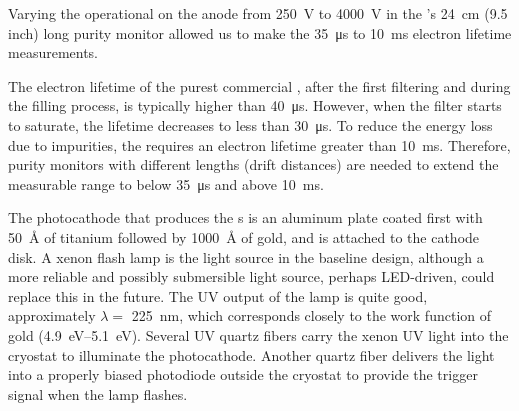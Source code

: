Varying the operational  on the anode from \SI{250}{V} to \SI{4000}{V} in the 's \SI{24}{cm} (9.5 inch) long purity monitor allowed us to make the \SI{35}{\micro\second} to \SI{10}{\milli\second} electron lifetime measurements. 


The electron lifetime of the purest commercial \lar, after the first filtering and during the filling process, is typically higher than \SI{40}{\micro\second}. However, when the filter starts to saturate, the lifetime decreases to less than \SI{30}{\micro\second}.  To %
reduce the energy loss due to impurities,  the  requires an electron lifetime greater than \SI{10}{\milli\second}. Therefore, purity monitors with different lengths (drift distances) are needed to extend the measurable range to below \SI{35}{\micro\second} and above  \SI{10}{\milli\second}.

The photocathode that produces the \phel{}s is an aluminum plate coated first with \SI{50}{\angstrom} of titanium followed by \SI{1000}{\angstrom} of gold, and is attached to the cathode disk.
A xenon flash lamp is the light source in the baseline design, although %
a more reliable and possibly submersible light source, perhaps LED-driven, could replace this in the future. The UV output of the lamp is quite good, approximately $\lambda=$ \SI{225}{\nano\meter}, which corresponds closely to the work function of gold (\SIrange{4.9}{5.1}{\eV}). 
Several UV quartz fibers carry the xenon UV light into the cryostat to illuminate the %
photocathode.   Another quartz fiber delivers the light into a properly biased photodiode outside the cryostat to provide the trigger signal when the lamp flashes. 



